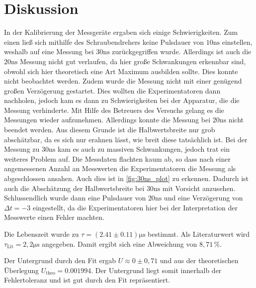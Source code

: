 \section{Diskussion}
\label{sec:Diskussion}

In der Kalibrierung der Messgeräte ergaben sich einige Schwierigkeiten.
Zum einen ließ sich mithilfe des Schraubendrehers keine Pulsdauer von $10 \unit{\nano\second}$ einstellen, weshalb auf eine Messung bei $30 \unit{\nano\second}$ zurückgegriffen wurde.
Allerdings ist auch die $20 \unit{\nano\second}$ Messung nicht gut verlaufen, da hier große Schwankungen erkennbar sind, obwohl sich hier theoretisch eine Art Maximum ausbilden sollte.
Dies konnte nicht beobachtet werden.
Zudem wurde die Messung nicht mit einer genügend großen Verzögerung gestartet.
Dies wollten die Experimentatoren dann nachholen, jedoch kam es dann zu Schwierigkeiten bei der Apparatur, die die Messung verhinderte.
Mit Hilfe des Betreuers des Versuchs gelang es die Messungen wieder aufzunehmen.
Allerdings konnte die Messung bei $20 \unit{\nano\second}$ nicht beendet werden.
Aus diesem Grunde ist die Halbwertsbreite nur grob abschätzbar, da es sich nur erahnen lässt, wie breit diese tatsächlich ist.
Bei der Messung zu $30 \unit{\nano\second}$ kam es auch zu massiven Schwankungen, jedoch trat ein weiteres Problem auf.
Die Messdaten flachten kaum ab, so dass nach einer angemessenen Anzahl an Messwerten die Experimentatoren die Messung als abgeschlossen ansahen.
Auch dies ist in \autoref{fig:30ns_plot} zu erkennen.
Dadurch ist auch die Abschätzung der Halbwertsbreite bei $30 \unit{\nano\second}$ mit Vorsicht anzusehen.
Schlussendlich wurde dann eine Pulsdauer von $20 \unit{\nano\second}$ und eine Verzögerung von $\Delta t = -3$ eingestellt, da die Experimentatoren hier bei der Interpretation der Messwerte einen Fehler machten.

Die Lebenszeit wurde zu $\tau = (2.41 \pm 0.11) \unit{\micro\second}$ bestimmt.
Als Literaturwert wird $\tau_\text{Lit} = 2,2 \unit{\micro\second}$ angegeben.
Damit ergibt sich eine Abweichung von $8,71 \, \% $.

Der Untergrund durch den Fit ergab $U \approx 0 \pm 0,71$ und aus der theoretischen Überlegung $U_\text{theo} = 0.001994$.
Der Untergrund liegt somit innerhalb der Fehlertoleranz und ist gut durch den Fit repräsentiert.